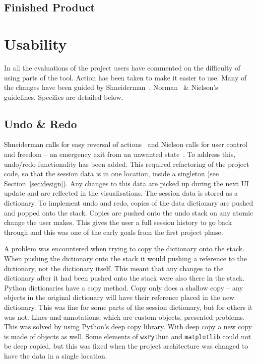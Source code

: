 \subsection{Finished Product}



\section{Usability}

In all the evaluations of the project users have commented on the difficulty of using parts of the tool.  Action has been taken to make it easier to use.  Many of the changes have been guided by Shneiderman~\cite{shgold}, Norman~\cite{normsev} \& Nielson's~\cite{neilten} guidelines.  Specifics are detailed below.

\subsection{Undo \& Redo}
\label{sec:undo}
Shneiderman calls for easy reversal of actions~\cite{shgold} and Nielson calls for user control and freedom -- an emergency exit from an unwanted state~\cite{neilten}.  To address this, undo/redo functionality has been added.  This required refactoring of the project code, so that the session data is in one location, inside a singleton (see Section~\ref{sec:design}). Any changes to this data are picked up during the next \ac{UI} update and are reflected in the visualisations.  The session data is stored as a dictionary.  To implement undo and redo, copies of the data dictionary are pushed and popped onto the stack.  Copies are pushed onto the undo stack on any atomic change the user makes.  This gives the user a full session history to go back through and this was one of the early goals from the first project phase.

A problem was encountered when trying to copy the dictionary onto the stack.  When pushing the dictionary onto the stack it would pushing a reference to the dictionary, not the dictionary itself. This meant that any changes to the dictionary after it had been pushed onto the stack were also there in the stack.  Python dictionaries have a copy method.  Copy only does a shallow copy -- any objects in the original dictionary will have their reference placed in the new dictionary.  This was fine for some parts of the session dictionary, but for others it was not. Lines and annotations, which are custom objects, presented problems.  This was solved by using Python's deep copy library.  With deep copy a new copy is made of objects as well.  Some elements of \texttt{wxPython} and \texttt{matplotlib} could not be deep copied, but this was fixed when the project architecture was changed to have the data in a single location.

